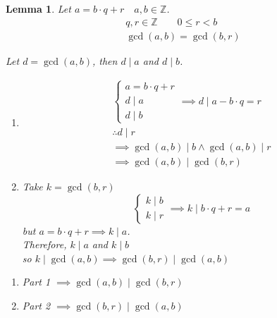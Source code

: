 \documentclass[letterpaper, 12pt]{article}
\newtheorem{lemma}[theorem]{Lemma}
\newenvironment{proof}[1][Proof]{\begin{trivlist}
\item[\hskip \labelsep {\bfseries #1}]}{\end{trivlist}}
\newcommand{\Z}{\mathbb{Z}}
\newcommand{\0}{\emptyset}
\begin{document}
    \begin{lemma}
        Let $a = b \cdot q + r \quad a, b \in \Z$.
        \begin{gather*}
            q, r \in \Z \qquad 0 \le r < b \\
            \gcd(a, b) = \gcd(b, r)
        \end{gather*}
        \begin{proof}
            Let $d = \gcd(a, b)$, then $d \mid a$ and $d \mid b$.
            \begin{enumerate}
                \item \begin{gather*}
                    \begin{cases}
                        a = b \cdot q + r \\
                        d \mid a \\
                        d \mid b
                    \end{cases}
                    \implies d \mid a - b \cdot q = r \\
                    \therefore d \mid r \\
                    \implies \gcd(a, b) \mid b \wedge \gcd(a, b) \mid r \\
                    \implies \gcd(a, b) \mid \gcd(b, r)
                \end{gather*}
                \item Take $k = \gcd(b, r)$ \\
                \[\begin{cases}
                    k \mid b \\
                    k \mid r
                \end{cases}
                \implies k \mid b \cdot q + r = a
                \]
                but $a = b \cdot q + r \implies k \mid a$. \\
                Therefore, $k \mid a$ and $k \mid b$ \\
                so $k \mid \gcd(a, b) \implies \gcd(b, r) \mid \gcd(a, b)$
            \end{enumerate}
            \begin{enumerate}
                \item Part 1 \(\implies \gcd(a, b) \mid \gcd(b, r)\)
                \item Part 2 \(\implies \gcd(b, r) \mid \gcd(a, b)\)
            \end{enumerate}
            \begin{gather*}

\end{gather*}
\end{proof}
\end{lemma}
\end{document}
